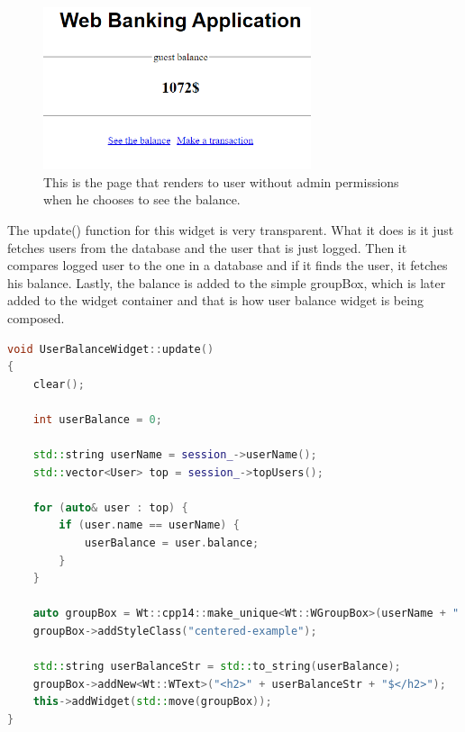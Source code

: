 \documentclass[a4paper,12pt]{book}
\begin{document}
{{\begin{figure}[H]
\centering
\includegraphics[width=0.7\textwidth]{balance}
\caption{This is the page that renders to user without admin permissions when he chooses to see the balance.}
\end{figure}

The update() function for this widget is very transparent. What it does is it just fetches users from the database and the user that is just logged. Then it compares logged user to the one in a database and if it finds the user, it fetches his balance. Lastly, the balance is added to the simple groupBox, which is later added to the widget container and that is how user balance widget is being composed.

\bigskip
\begin{lstlisting}[frame=single, basicstyle=\small, language=C++, caption={UserBalanceWidget::update() function.}, captionpos=b]
void UserBalanceWidget::update()
{
	clear();

	int userBalance = 0;

	std::string userName = session_->userName();
	std::vector<User> top = session_->topUsers();

	for (auto& user : top) {
		if (user.name == userName) {
			userBalance = user.balance;
		}
	}

	auto groupBox = Wt::cpp14::make_unique<Wt::WGroupBox>(userName + " balance");
	groupBox->addStyleClass("centered-example");

	std::string userBalanceStr = std::to_string(userBalance);
	groupBox->addNew<Wt::WText>("<h2>" + userBalanceStr + "$</h2>");
	this->addWidget(std::move(groupBox));
}
\end{lstlisting}
}

}
\end{document}
